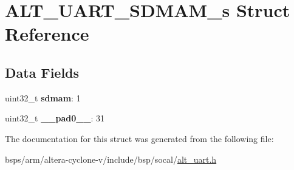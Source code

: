 \hypertarget{structALT__UART__SDMAM__s}{}\section{A\+L\+T\+\_\+\+U\+A\+R\+T\+\_\+\+S\+D\+M\+A\+M\+\_\+s Struct Reference}
\label{structALT__UART__SDMAM__s}
\subsection*{Data Fields}
\begin{DoxyCompactItemize}
\item 
\mbox{\label{structALT__UART__SDMAM__s_aeb86fcb8cfc8e1efd782490573b02bf6}} 
uint32\+\_\+t {\bfseries sdmam}\+: 1
\item 
\mbox{\label{structALT__UART__SDMAM__s_a35fa64f6810f0e6cc0f4226b0c45950a}} 
uint32\+\_\+t {\bfseries \+\_\+\+\_\+pad0\+\_\+\+\_\+}\+: 31
\end{DoxyCompactItemize}


The documentation for this struct was generated from the following file\+:\begin{DoxyCompactItemize}
\item 
bsps/arm/altera-\/cyclone-\/v/include/bsp/socal/\mbox{\hyperlink{alt__uart_8h}{alt\+\_\+uart.\+h}}\end{DoxyCompactItemize}
